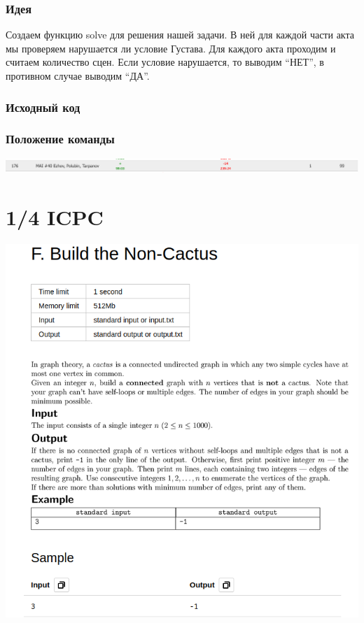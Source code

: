 \documentclass[12pt]{article}
\begin{document}
\subsubsection*{Идея}
Создаем функцию solve для решения нашей задачи. В ней для каждой части акта мы проверяем нарушается ли условие Густава. Для каждого акта проходим и считаем количество сцен. 
Если условие нарушается, то выводим “НЕТ”, в противном случае выводим “ДА”.
\\ 
\subsubsection*{Исходный код}

\subsubsection*{Положение команды}
\includegraphics[scale=0.5]{images/Vsesib.png}\newline\noindent

\pagebreak
\section{1/4 ICPC}
\includegraphics[scale=0.75]{statements/QuarterFinal_F.png}
\end{document}
